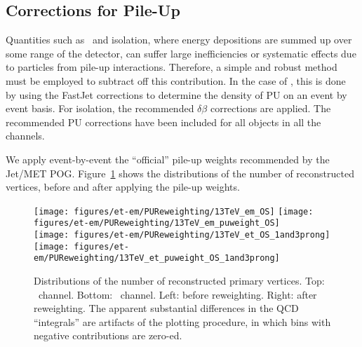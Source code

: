 \subsection{Corrections for Pile-Up}\label{ss:puvalidation}

Quantities such as \MET ~and isolation, where energy depositions are
summed up over some range of the detector, can suffer large
inefficiencies or systematic effects due to particles from pile-up
interactions. Therefore, a simple and robust method must be employed
to subtract off this contribution.  In the
case of \MET, this is done by using the FastJet corrections to
determine the density of PU on an event by event basis. For isolation, the 
recommended $\delta\beta$ corrections are applied. The
recommended PU corrections have been included for all objects in all
the channels.




We apply event-by-event the ``official'' pile-up weights recommended by the Jet/MET POG.  Figure~\ref{fig:nvtx} shows the distributions of the number of reconstructed vertices, before and after applying the pile-up weights.

\begin{figure}
  \centering
  \texttt{[image: figures/et-em/PUReweighting/13TeV\_em\_OS]}
  \texttt{[image: figures/et-em/PUReweighting/13TeV\_em\_puweight\_OS]} \\
  \texttt{[image: figures/et-em/PUReweighting/13TeV\_et\_OS\_1and3prong]}
  \texttt{[image: figures/et-em/PUReweighting/13TeV\_et\_puweight\_OS\_1and3prong]} \\
  \caption{\label{fig:nvtx} Distributions of the number of
    reconstructed primary vertices.  Top: \emu ~channel.  Bottom: \etau ~channel.  Left: before reweighting.  Right: after reweighting. The apparent substantial
    differences in the QCD ``integrals'' are artifacts of the plotting
    procedure, in which bins with negative contributions are zero-ed.}
\end{figure}
